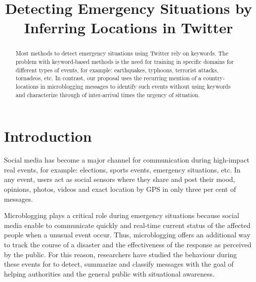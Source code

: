 \documentclass{ewic}
\begin{document}

\title{Detecting Emergency Situations by Inferring Locations in Twitter}





\begin{abstract}
Most methods to detect emergency situations using Twitter rely on keywords. The problem with keyword-based methods is the need for training in specific domains for different types of events, for example: earthquakes, typhoons, terrorist attacks, tornadeos, etc.
In contrast, our proposal uses the recurring mention of a country-locations in microblogging messages to identify such events without using keywords and characterize through of inter-arrival times the urgency of situation.
\end{abstract}


\maketitle

\section{Introduction}
Social media has become a major channel for communication during high-impact real events, for example: elections, sports events, emergency situations, etc. In any event, users act as social sensors where they share and post their mood, opinions, photos, videos and exact location by GPS in only three per cent of messages.

Microblogging plays a critical role during emergency situations because social media enable to communicate quickly and real-time current status of the affected people when a unusual event occur. Thus, microblogging offers an additional way to track the course of a disaster and the effectiveness of the response as perceived by the public. For this reason, researchers have studied the behaviour during these events for to detect, summarize and classify messages with the goal of helping authorities and the general public with situational awareness.
\end{document}
